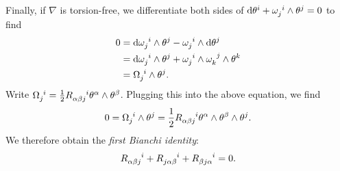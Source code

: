 \documentclass{book}
\renewcommand{\d}{\mathrm{d}}
\theoremstyle{definition}
\numberwithin{equation}{section}
\begin{document}
Finally, if $\nabla$ is torsion-free, we differentiate both sides of $\d\theta^i + \tensor{\omega}{_j^i} \wedge \theta^j = 0$ to find
\begin{equation} \begin{aligned}
    0 &= \d\tensor{\omega}{_j^i} \wedge \theta^j - \tensor{\omega}{_j^i} \wedge \d\theta^j \\
      &= \d\tensor{\omega}{_j^i} \wedge \theta^j + \tensor{\omega}{_j^i} \wedge \tensor{\omega}{_k^j} \wedge \theta^k \\
      &= \tensor{\Omega}{_j^i} \wedge \theta^j.
\end{aligned} \end{equation}
Write $\tensor{\Omega}{_j^i} = \frac{1}{2} \tensor{R}{_\alpha_\beta_j^i} \theta^\alpha \wedge \theta^\beta$. Plugging this into the above equation, we find 
\begin{equation}
    0 = \tensor{\Omega}{_j^i} \wedge \theta^j = \frac{1}{2} \tensor{R}{_\alpha_\beta_j^i} \theta^\alpha \wedge \theta^\beta \wedge \theta^j.
\end{equation}
We therefore obtain the \textit{first Bianchi identity}:
\begin{equation}
    \tensor{R}{_\alpha_\beta_j^i} + \tensor{R}{_j_\alpha_\beta^i} + \tensor{R}{_\beta_j_\alpha^i} = 0.
\end{equation}
\end{document}
